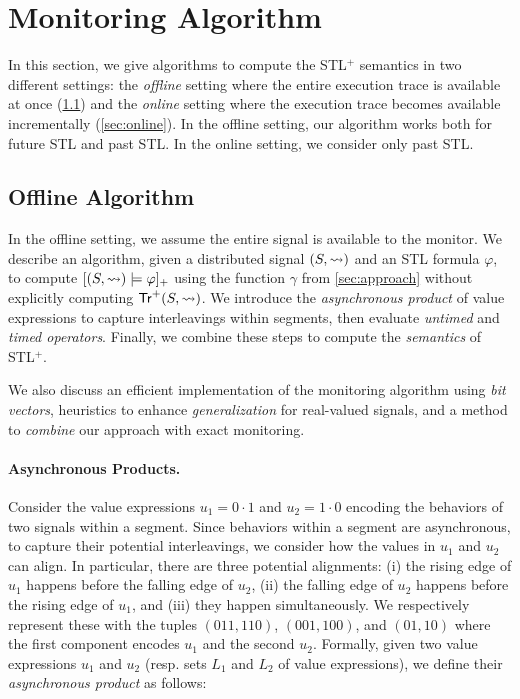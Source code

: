 \section{Monitoring Algorithm} 
\label{sec:algorithm}

\bgroup \color{red}
In this section, we give algorithms to compute the STL$^+$ semantics in two different settings: the \emph{offline} setting where the entire execution trace is available at once (\cref{sec:offline}) and the \emph{online} setting where the execution trace becomes available incrementally (\cref{sec:online}).
In the offline setting, our algorithm works both for future STL and past STL.
In the online setting, we consider only past STL.
\egroup

\subsection{Offline Algorithm} \label{sec:offline}
In the offline setting, we assume the entire signal is available to the monitor.
We describe an algorithm, given a distributed signal $(S,{\rightsquigarrow})$ and an STL formula $\varphi$, to compute $[(S,{\rightsquigarrow}) \models \varphi]_+$ using the function $\gamma$ from \cref{sec:approach} without explicitly computing $\mathsf{Tr}^+(S,{\rightsquigarrow})$.
We introduce the \emph{asynchronous product} of value expressions to capture interleavings within segments, then evaluate \emph{untimed} and \emph{timed operators}.
Finally, we combine these steps to compute the \emph{semantics} of STL$^+$.

We also discuss an efficient implementation of the monitoring algorithm using \emph{bit vectors}, heuristics to enhance \emph{generalization} for real-valued signals, and a method to \emph{combine} our approach with exact monitoring.

\paragraph*{Asynchronous Products.}
Consider the value expressions $u_1 = 0 \cdot 1$ and $u_2 = 1 \cdot 0$ encoding the behaviors of two signals within a segment.
Since behaviors within a segment are asynchronous, to capture their potential interleavings, we consider how the values in $u_1$ and $u_2$ can align.
In particular, there are three potential alignments:
(i) the rising edge of $u_1$ happens before the falling edge of $u_2$,
(ii) the falling edge of $u_2$ happens before the rising edge of $u_1$, and
(iii) they happen simultaneously.
We respectively represent these with the tuples $(011, 110)$, $(001, 100)$, and $(01, 10)$ where the first component encodes $u_1$ and the second $u_2$.
Formally, given two value expressions $u_1$ and $u_2$ (resp.  sets $L_1$ and $L_2$ of value expressions), we define their \emph{asynchronous product} as follows:

